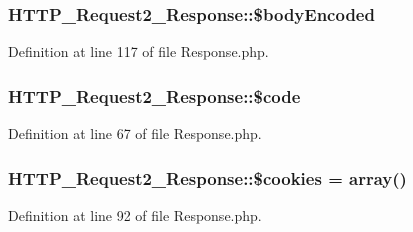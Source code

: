 \subsubsection[{\$body\+Encoded}]{\setlength{\rightskip}{0pt plus 5cm}H\+T\+T\+P\+\_\+\+Request2\+\_\+\+Response\+::\$body\+Encoded\hspace{0.3cm}{\ttfamily [protected]}}\label{classHTTP__Request2__Response_a1ab2bec927b0ac3d7cf82888479a4fea}


Definition at line 117 of file Response.\+php.

\hypertarget{classHTTP__Request2__Response_a974eeb592b307dca6c7d02e0311832f5}{}
\subsubsection[{\$code}]{\setlength{\rightskip}{0pt plus 5cm}H\+T\+T\+P\+\_\+\+Request2\+\_\+\+Response\+::\$code\hspace{0.3cm}{\ttfamily [protected]}}\label{classHTTP__Request2__Response_a974eeb592b307dca6c7d02e0311832f5}


Definition at line 67 of file Response.\+php.

\hypertarget{classHTTP__Request2__Response_af1d49532aaf677e27046fafff4f5e985}{}
\subsubsection[{\$cookies}]{\setlength{\rightskip}{0pt plus 5cm}H\+T\+T\+P\+\_\+\+Request2\+\_\+\+Response\+::\$cookies = array()\hspace{0.3cm}{\ttfamily [protected]}}\label{classHTTP__Request2__Response_af1d49532aaf677e27046fafff4f5e985}


Definition at line 92 of file Response.\+php.

\hypertarget{classHTTP__Request2__Response_ab87ff3f614066accc95a6f29f23bc051}{}
